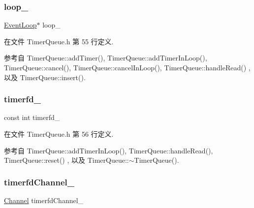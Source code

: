 \subsubsection{\texorpdfstring{loop\+\_\+}{loop\_}}
{\footnotesize\ttfamily \hyperlink{classmuduo_1_1EventLoop}{Event\+Loop}$\ast$ loop\+\_\+\hspace{0.3cm}{\ttfamily [private]}}



在文件 Timer\+Queue.\+h 第 55 行定义.



参考自 Timer\+Queue\+::add\+Timer(), Timer\+Queue\+::add\+Timer\+In\+Loop(), Timer\+Queue\+::cancel(), Timer\+Queue\+::cancel\+In\+Loop(), Timer\+Queue\+::handle\+Read() , 以及 Timer\+Queue\+::insert().

\mbox{\label{classmuduo_1_1TimerQueue_acf759a4fb3d6057907231d57dabc92a1}} 
\subsubsection{\texorpdfstring{timerfd\+\_\+}{timerfd\_}}
{\footnotesize\ttfamily const int timerfd\+\_\+\hspace{0.3cm}{\ttfamily [private]}}



在文件 Timer\+Queue.\+h 第 56 行定义.



参考自 Timer\+Queue\+::add\+Timer\+In\+Loop(), Timer\+Queue\+::handle\+Read(), Timer\+Queue\+::reset() , 以及 Timer\+Queue\+::$\sim$\+Timer\+Queue().

\mbox{\label{classmuduo_1_1TimerQueue_a5f622e650258ae6484bc627f816a1650}} 
\subsubsection{\texorpdfstring{timerfd\+Channel\+\_\+}{timerfdChannel\_}}
{\footnotesize\ttfamily \hyperlink{classmuduo_1_1Channel}{Channel} timerfd\+Channel\+\_\+\hspace{0.3cm}{\ttfamily [private]}}




